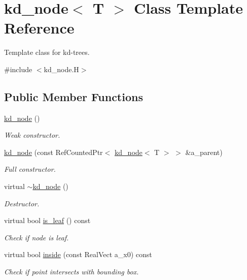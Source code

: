 \hypertarget{classkd__node}{}\section{kd\+\_\+node$<$ T $>$ Class Template Reference}
\label{classkd__node}


Template class for kd-\/trees.  




{\ttfamily \#include $<$kd\+\_\+node.\+H$>$}

\subsection*{Public Member Functions}
\begin{DoxyCompactItemize}
\item 
\hyperlink{classkd__node_ab69cc4f5b607e2bc50b0d82a66079147}{kd\+\_\+node} ()
\begin{DoxyCompactList}\small\item\em Weak constructor. \end{DoxyCompactList}\item 
\hyperlink{classkd__node_aae825256234f07dd904028c1942a5206}{kd\+\_\+node} (const Ref\+Counted\+Ptr$<$ \hyperlink{classkd__node}{kd\+\_\+node}$<$ T $>$ $>$ \&a\+\_\+parent)
\begin{DoxyCompactList}\small\item\em Full constructor. \end{DoxyCompactList}\item 
virtual \hyperlink{classkd__node_a0d92a2689bbd09ea17a723d1f31c895f}{$\sim$kd\+\_\+node} ()
\begin{DoxyCompactList}\small\item\em Destructor. \end{DoxyCompactList}\item 
virtual bool \hyperlink{classkd__node_a3f1fbbd5e54f04b0a9d553668e0542ff}{is\+\_\+leaf} () const 
\begin{DoxyCompactList}\small\item\em Check if node is leaf. \end{DoxyCompactList}\item 
virtual bool \hyperlink{classkd__node_a989bfd0c33bca190537bfcc51385ae32}{inside} (const Real\+Vect a\+\_\+x0) const 
\begin{DoxyCompactList}\small\item\em Check if point intersects with bounding box. \end{DoxyCompactList}\item 

\end{DoxyCompactItemize}
